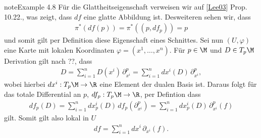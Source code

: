 \documentclass[letterpaper,10pt,german]{jupyterBook}
\begin{document}
\begin{sphinxadmonition}{note}{Example 4.8}
\sphinxAtStartPar
Für die Glattheitseigenschaft verweisen wir auf {[}\hyperlink{cite.references:id18}{Lee03}{]} Prop. 10.22., was zeigt, dass \(df\) eine glatte Abbildung ist. Desweiteren sehen wir, dass
\begin{equation*}
\begin{split}\pi^\ast(df(p)) = \pi^\ast((p,df_p)) = p \end{split}
\end{equation*}
\sphinxAtStartPar
und somit gilt per Definition diese Eigenschaft eines Schnittes. Sei nun \((U,\varphi)\) eine Karte mit lokalen Koordinaten \(\varphi = (x^1,\ldots, x^n)\). Für \(p\in\M\) und \(D\in T_p\M\) Derivation gilt nach ??, dass
\begin{equation*}
\begin{split}D = \sum_{i=1}^n D(x^i)\, \partial_{x^i}^p = \sum_{i=1}^n dx^{i}(D)\, \partial_{x^i}^p,\end{split}
\end{equation*}
\sphinxAtStartPar
wobei hierbei \(dx^{i}:T_p\M\to\R\) eine Element der dualen Basis ist. Daraus folgt für das totale Differential an \(p\), \(df_p:T_p\M\to\R\), per Defintion dass
\begin{equation*}
\begin{split}df_p(D) = \sum_{i=1}^n dx_p^{i}(D)\, df_p(\partial_{x^i}^p) = 
\sum_{i=1}^n dx_p^{i}(D)\, \partial_{x^i}^p(f)\end{split}
\end{equation*}
\sphinxAtStartPar
gilt. Somit gilt also lokal in \(U\)
\begin{equation*}
\begin{split}df = \sum_{i=1}^n dx^{i}\, \partial_{x^i}(f).\end{split}
\end{equation*}\end{sphinxadmonition}
\end{document}
